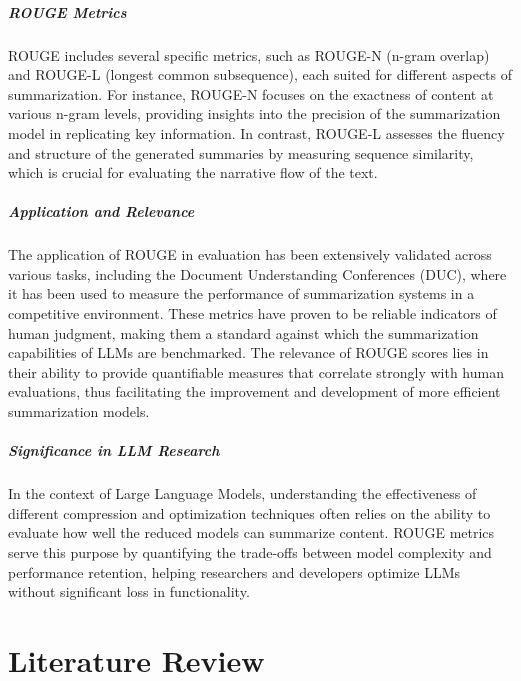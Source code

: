     \paragraph{ROUGE Metrics}
    ROUGE includes several specific metrics, such as ROUGE-N (n-gram overlap) and ROUGE-L (longest common subsequence), each suited for different aspects of summarization. For instance, ROUGE-N focuses on the exactness of content at various n-gram levels, providing insights into the precision of the summarization model in replicating key information. In contrast, ROUGE-L assesses the fluency and structure of the generated summaries by measuring sequence similarity, which is crucial for evaluating the narrative flow of the text.

    \paragraph{Application and Relevance}
    The application of ROUGE in evaluation has been extensively validated across various tasks, including the Document Understanding Conferences (DUC), where it has been used to measure the performance of summarization systems in a competitive environment. These metrics have proven to be reliable indicators of human judgment, making them a standard against which the summarization capabilities of LLMs are benchmarked. The relevance of ROUGE scores lies in their ability to provide quantifiable measures that correlate strongly with human evaluations, thus facilitating the improvement and development of more efficient summarization models.

    \paragraph{Significance in LLM Research}
    In the context of Large Language Models, understanding the effectiveness of different compression and optimization techniques often relies on the ability to evaluate how well the reduced models can summarize content. ROUGE metrics serve this purpose by quantifying the trade-offs between model complexity and performance retention, helping researchers and developers optimize LLMs without significant loss in functionality.

\chapter{Literature Review}

